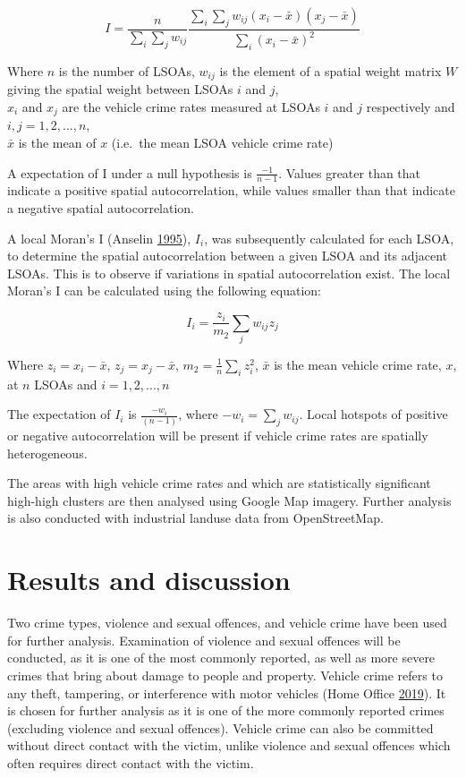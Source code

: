 \documentclass[]{article}
\theoremstyle{definition}
\theoremstyle{definition}
\theoremstyle{definition}
\theoremstyle{remark}
\begin{document}
\[I=\frac{n} {\sum_{i}\sum_{j}w_{ij}} \frac{\sum_{i}\sum_{j}w_{ij}(x_i-\bar{x})(x_j-\bar{x})} {\sum_{i}(x_i-\bar{x})^2}\]

Where \(n\) is the number of LSOAs, \(w_{ij}\) is the element of a
spatial weight matrix \(W\) giving the spatial weight between LSOAs
\(i\) and \(j\),\\
\(x_i\) and \(x_j\) are the vehicle crime rates measured at LSOAs \(i\)
and \(j\) respectively and \(i,j=1,2,...,n\),\\
\(\bar{x}\) is the mean of \(x\) (i.e.~the mean LSOA vehicle crime rate)

A expectation of I under a null hypothesis is \(\frac{-1} {n-1}\).
Values greater than that indicate a positive spatial autocorrelation,
while values smaller than that indicate a negative spatial
autocorrelation.

A local Moran's I (Anselin \protect\hyperlink{ref-Anselin1995}{1995}),
\(I_i\), was subsequently calculated for each LSOA, to determine the
spatial autocorrelation between a given LSOA and its adjacent LSOAs.
This is to observe if variations in spatial autocorrelation exist. The
local Moran's I can be calculated using the following equation:

\[I_i=\frac{z_i}{m_2}\sum_{j}w_{ij}z_j\]

Where \(z_i = x_i-\bar{x}\), \(z_j = x_j-\bar{x}\),
\(m_2=\frac{1}{n}\sum_{i}z_i^2\), \(\bar{x}\) is the mean vehicle crime
rate, \(x\), at \(n\) LSOAs and \(i=1,2,...,n\)

The expectation of \(I_i\) is \(\frac{-w_i}{(n-1)}\), where
\(-w_i=\sum_{j}w_{ij}\). Local hotspots of positive or negative
autocorrelation will be present if vehicle crime rates are spatially
heterogeneous.

The areas with high vehicle crime rates and which are statistically
significant high-high clusters are then analysed using Google Map
imagery. Further analysis is also conducted with industrial landuse data
from OpenStreetMap. \pagebreak

\section{Results and discussion}\label{results-and-discussion}

Two crime types, violence and sexual offences, and vehicle crime have
been used for further analysis. Examination of violence and sexual
offences will be conducted, as it is one of the most commonly reported,
as well as more severe crimes that bring about damage to people and
property. Vehicle crime refers to any theft, tampering, or interference
with motor vehicles (Home Office
\protect\hyperlink{ref-Office2019}{2019}). It is chosen for further
analysis as it is one of the more commonly reported crimes (excluding
violence and sexual offences). Vehicle crime can also be committed
without direct contact with the victim, unlike violence and sexual
offences which often requires direct contact with the victim.
\end{document}
